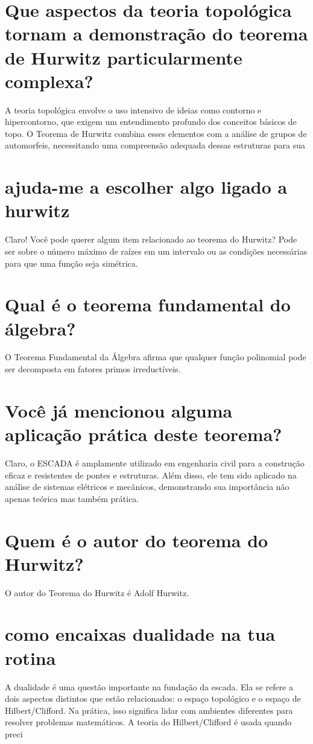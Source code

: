 \documentclass[11pt,a4paper]{article}
\begin{document}
\section{Que aspectos da teoria topológica tornam a demonstração do teorema de Hurwitz particularmente complexa?}
A teoria topológica envolve o uso intensivo de ideias como contorno e hipercontorno, que exigem um entendimento profundo dos conceitos básicos de topo. O Teorema de Hurwitz combina esses elementos com a análise de grupos de automorfeis, necessitando uma compreensão adequada dessas estruturas para sua

\section{ajuda-me a escolher algo ligado a hurwitz}
Claro! Você pode querer algum item relacionado ao teorema do Hurwitz? Pode ser sobre o número máximo de raízes em um intervalo ou as condições necessárias para que uma função seja simétrica.

\section{Qual é o teorema fundamental do álgebra?}
O Teorema Fundamental da Álgebra afirma que qualquer função polinomial pode ser decomposta em fatores primos irreductíveis.

\section{Você já mencionou alguma aplicação prática deste teorema?}
Claro, o ESCADA é amplamente utilizado em engenharia civil para a construção eficaz e resistentes de pontes e estruturas. Além disso, ele tem sido aplicado na análise de sistemas elétricos e mecânicos, demonstrando sua importância não apenas teórica mas também prática.

\section{Quem é o autor do teorema do Hurwitz?}
O autor do Teorema do Hurwitz é Adolf Hurwitz.

\section{como encaixas dualidade na tua rotina}
A dualidade é uma questão importante na fundação da escada. Ela se refere a dois aspectos distintos que estão relacionados: o espaço topológico e o espaço de Hilbert/Clifford. Na prática, isso significa lidar com ambientes diferentes para resolver problemas matemáticos. A teoria do Hilbert/Clifford é usada quando preci
\end{document}
